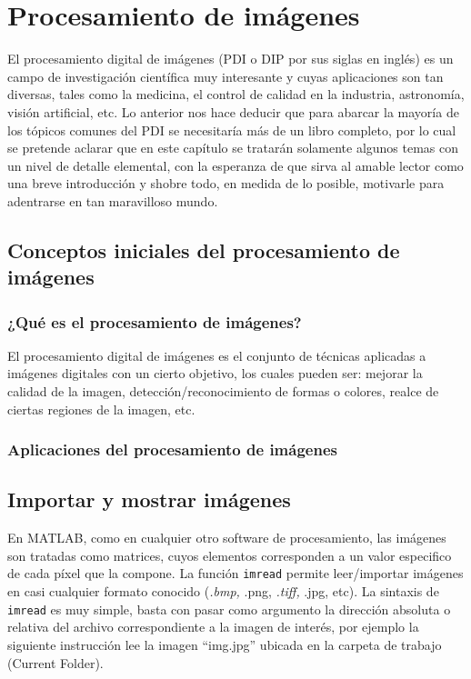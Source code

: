 \chapter{Procesamiento de imágenes}\label{procesamiento-de-imagenes}

El procesamiento digital de imágenes (PDI o DIP por sus siglas en
inglés) es un campo de investigación científica muy interesante y cuyas
aplicaciones son tan diversas, tales como la medicina, el control de
calidad en la industria, astronomía, visión artificial, etc. Lo anterior
nos hace deducir que para abarcar  la mayoría de los
tópicos comunes del PDI se necesitaría más de un libro completo, por lo
cual se pretende aclarar que en este capítulo se tratarán solamente
algunos temas con un nivel de detalle elemental, con la esperanza de que
sirva al amable lector como una breve introducción y shobre todo, en
medida de lo posible, motivarle para adentrarse en tan maravilloso mundo.

\section{Conceptos iniciales del procesamiento de imágenes}

\subsection{¿Qué es el procesamiento de imágenes?}

El procesamiento digital de imágenes es el conjunto de técnicas
aplicadas a imágenes digitales con un cierto objetivo, los cuales pueden
ser: mejorar la calidad de la imagen, detección/reconocimiento de formas
o colores, realce de ciertas regiones de la imagen, etc.

\subsection{Aplicaciones del procesamiento de imágenes}

\section{Importar y mostrar imágenes}

En MATLAB, como en cualquier otro software de procesamiento, las
imágenes son tratadas como matrices, cuyos elementos corresponden a un
valor especifico de cada píxel que la compone. La función
\texttt{imread} permite leer/importar imágenes en casi cualquier formato
conocido (\emph{.bmp, }.png, \emph{.tiff, }.jpg, etc). La sintaxis de
\texttt{imread} es muy simple, basta con pasar como argumento la
dirección absoluta o relativa del archivo correspondiente a la imagen de
interés, por ejemplo la siguiente instrucción lee la imagen ``img.jpg''
ubicada en la carpeta de trabajo (Current Folder).

